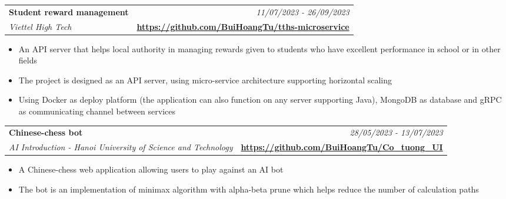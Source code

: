 \documentclass[a4paper,11pt]{article}
\makeatletter
\newcommand{\resumeProject}[4]{
\vspace{0.5mm}\item
    \begin{tabular*}{0.98\textwidth}[t]{l@{\extracolsep{\fill}}r}
        \textbf{#1} & \textit{\footnotesize{#3}} \\
        \footnotesize{\textit{#2}} & \footnotesize{#4}
    \end{tabular*}
    \vspace{-2.4mm}
}
\newcommand{\resumeItemListStart}{\begin{justify}\begin{itemize}[leftmargin=3ex, rightmargin=2ex, noitemsep,labelsep=1.2mm,itemsep=0mm]\small}
\newcommand{\resumeItemListEnd}{\end{itemize}\end{justify}\vspace{-2mm}}
\makeatother
\begin{document}
    \resumeProject
    {Student reward management} %
    {Viettel High Tech} %
    {11/07/2023 - 26/09/2023} %
    {\href{https://github.com/BuiHoangTu/tths-microservice}{\textbf{https://github.com/BuiHoangTu/tths-microservice}}} %
    \resumeItemListStart
    	\item {An API server that helps local authority in managing rewards given to students who have excellent performance in school or in other fields}
      	\item {The project is designed as an API server, using micro-service architecture supporting horizontal scaling}
      	\item {Using Docker as deploy platform (the application can also function on any server supporting Java), MongoDB as database and gRPC as communicating channel between services}
    \resumeItemListEnd
    \vspace{-1mm}
    
    \resumeProject
    {Chinese-chess bot}
    {AI Introduction - Hanoi University of Science and Technology}
    {28/05/2023 - 13/07/2023} 
    {\href{https://github.com/BuiHoangTu/Co_tuong_UI}{\textbf{https://github.com/BuiHoangTu/Co\_tuong\_UI}}}
    \resumeItemListStart
    	\item {A Chinese-chess web application allowing users to play against an AI bot}
    	\item {The bot is an implementation of minimax algorithm with alpha-beta prune which helps reduce the number of calculation paths}
    \resumeItemListEnd
\end{document}
